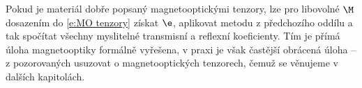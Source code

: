 Pokud je materiál dobře popsaný magnetooptickými tenzory, lze pro libovolné $\M$ dosazením do \eqref{e:MO tenzory} získat $\e$, aplikovat metodu z předchozího oddílu a tak spočítat všechny myslitelné transmisní a reflexní koeficienty.
Tím je přímá úloha magnetooptiky formálně vyřešena, v praxi je však častější obrácená úloha -- z pozorovaných usuzovat o magnetooptických tenzorech, čemuž se věnujeme v dalších kapitolách.
